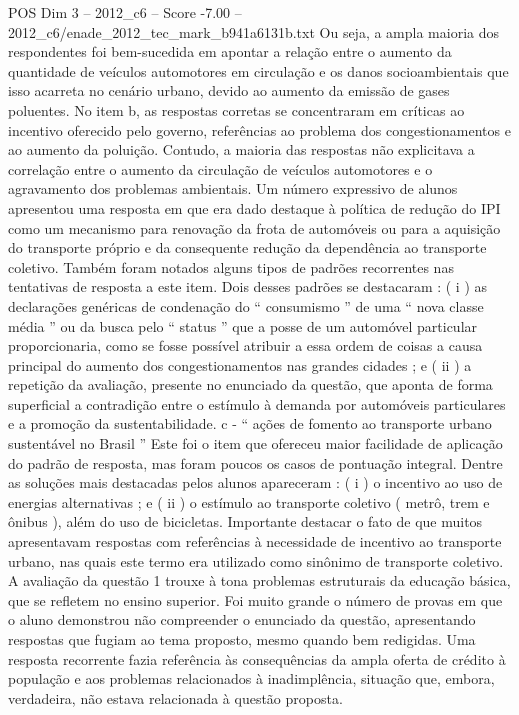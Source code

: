 \begin{textsample}{POS Dim 3 – 2012\_c6 – Score -7.00 – 2012\_c6/enade\_2012\_tec\_mark\_b941a6131b.txt}
Ou seja, a ampla maioria dos respondentes foi bem-sucedida em apontar a relação entre o aumento da quantidade de veículos automotores em circulação e os danos socioambientais que isso acarreta no cenário urbano, devido ao aumento da emissão de gases poluentes.
No item b, as respostas corretas se concentraram em críticas ao incentivo oferecido pelo governo, referências ao problema dos congestionamentos e ao aumento da poluição.
Contudo, a maioria das respostas não explicitava a correlação entre o aumento da circulação de veículos automotores e o agravamento dos problemas ambientais.
Um número expressivo de alunos apresentou uma resposta em que era dado destaque à política de redução do IPI como um mecanismo para renovação da frota de automóveis ou para a aquisição do transporte próprio e da consequente redução da dependência ao transporte coletivo.
Também foram notados alguns tipos de padrões recorrentes nas tentativas de resposta a este item.
Dois desses padrões se destacaram : ( i ) as declarações genéricas de condenação do “ consumismo ” de uma “ nova classe média ” ou da busca pelo “ status ” que a posse de um automóvel particular proporcionaria, como se fosse possível atribuir a essa ordem de coisas a causa principal do aumento dos congestionamentos nas grandes cidades ; e ( ii ) a repetição da avaliação, presente no enunciado da questão, que aponta de forma superficial a contradição entre o estímulo à demanda por automóveis particulares e a promoção da sustentabilidade. c - “ ações de fomento ao transporte urbano sustentável no Brasil ” Este foi o item que ofereceu maior facilidade de aplicação do padrão de resposta, mas foram poucos os casos de pontuação integral.
Dentre as soluções mais destacadas pelos alunos apareceram : ( i ) o incentivo ao uso de energias alternativas ; e ( ii ) o estímulo ao transporte coletivo ( metrô, trem e ônibus ), além do uso de bicicletas.
Importante destacar o fato de que muitos apresentavam respostas com referências à necessidade de incentivo ao transporte urbano, nas quais este termo era utilizado como sinônimo de transporte coletivo.
A avaliação da questão 1 trouxe à tona problemas estruturais da educação básica, que se refletem no ensino superior.
Foi muito grande o número de provas em que o aluno demonstrou não compreender o enunciado da questão, apresentando respostas que fugiam ao tema proposto, mesmo quando bem redigidas.
Uma resposta recorrente fazia referência às consequências da ampla oferta de crédito à população e aos problemas relacionados à inadimplência, situação que, embora, verdadeira, não estava relacionada à questão proposta.

\end{textsample}
